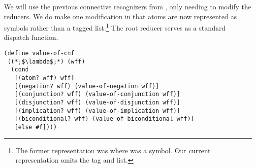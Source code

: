\setlength{\fboxsep}{.5em}
\noindent{}

We will use the previous connective recognizers from , only needing to modify the reducers. We do make one modification in that atoms are now represented as symbols rather than a tagged list.\footnote{The former representation was  where  was a symbol. Our current representation omits the tag and list.} The root reducer serves as a standard dispatch function.

\begin{cl}[]{}
\begin{lstlisting}[language=MyScheme]
(define value-of-cnf
 ((*;$\lambda$;*) (wff)
  (cond
   [(atom? wff) wff]
   [(negation? wff) (value-of-negation wff)]
   [(conjunction? wff) (value-of-conjunction wff)]
   [(disjunction? wff) (value-of-disjunction wff)]
   [(implication? wff) (value-of-implication wff)]
   [(biconditional? wff) (value-of-biconditional wff)]
   [else #f])))
\end{lstlisting}
\end{cl}

